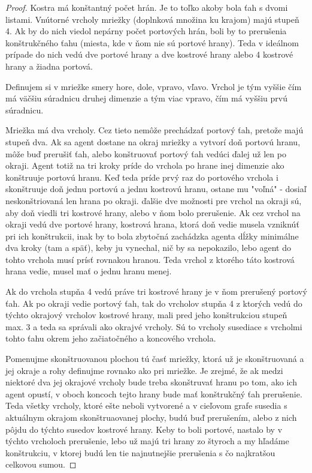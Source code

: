 \begin{proof}
Kostra má konštantný počet hrán. Je to toľko akoby bola ťah s dvomi listami.
Vnútorné vrcholy mriežky (doplnková množina ku krajom) majú stupeň 4. Ak by
do nich viedol nepárny počet portových hrán, boli by to prerušenia
konštrukčného ťahu (miesta, kde v ňom nie sú portové hrany). Teda v ideálnom
prípade do nich vedú dve portové hrany a dve kostrové hrany alebo 4 kostrové
hrany a žiadna portová.

Definujem si v mriežke smery hore, dole, vpravo, vľavo. Vrchol je tým vyššie
čím má väčšiu súradnicu druhej dimenzie a tým viac vpravo, čím má vyššiu
prvú súradnicu.

Mriežka má dva vrcholy. Cez tieto nemôže prechádzať portový ťah, pretože
majú stupeň dva. Ak sa agent dostane na okraj mriežky a vytvorí doň portovú
hranu, môže buď prerušiť ťah, alebo konštruovať portový ťah vedúci ďalej už
len po okraji. Agent totiž na tri kroky príde do vrchola po hrane inej
dimenzie ako konštruuje portovú hranu. Keď teda príde prvý raz do portového
vrchola i skonštruuje doň jednu portovú a jednu kostrovú hranu, ostane mu
"voľná" - dosiaľ neskonštriovaná len hrana po okraji. ďalšie dve možnosti
pre vrchol na okraji sú, aby doň viedli tri kostrové hrany, alebo v ňom bolo
prerušenie. Ak cez vrchol na okraji vedú dve portové hrany, kostrová hrana,
ktorá doň vedie musela vzniknúť pri ich konštrukcii, inak by to bola
zbytočná zachádzka agenta dĺžky minimálne dva kroky (tam a späť), keby ju
vynechal, nič by sa nepokazilo, lebo agent do tohto vrchola musí prísť
rovnakou hranou. Teda vrchol z ktorého táto kostrová hrana vedie, musel mať
o jednu hranu menej.

Ak do vrchola stupňa 4 vedú práve tri kostrové hrany je v ňom prerušený portový
ťah. Ak po okraji vedie portový ťah, tak do vrcholov stupňa 4 z ktorých vedú do
týchto okrajový vrcholov kostrové hrany, mali pred jeho konštrukciou stupeň
max. 3 a teda sa správali ako okrajvé vrcholy. Sú to vrcholy susediace s
vrcholmi tohto ťahu okrem jeho začiatočného a koncového vrchola.

Pomenujme skonštruovanou plochou tú časť mriežky, ktorá už je skonštruovaná
a jej okraje a rohy definujme rovnako ako pri mriežke. Je zrejmé, že ak
medzi niektoré dva jej okrajové vrcholy bude treba skonštruvať hranu po tom,
ako ich agent opustí, v oboch koncoch tejto hrany bude mať konštrukčný ťah 
prerušenie. Teda všetky vrcholy, ktoré ešte neboli vytvorené a v cieľovom
grafe susedia s aktuálnym okrajom skonštruaovanej plochy, budú buď
prerušením, alebo z nich pôjdu do týchto susedov kostrové hrany. Keby to
boli portové, nastalo by v týchto vrcholoch prerušenie, lebo už majú tri
hrany zo štyroch a my hľadáme konštrukciu, v ktorej budú len tie
najnutnejšie prerušenia s čo najkratšou celkovou sumou.

\end{proof}



